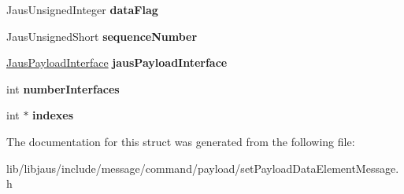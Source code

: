\begin{DoxyCompactItemize}
\item 
\hypertarget{struct_set_payload_data_element_message_struct_a895f189959ef442e142d099afbcdb52c}{\-Jaus\-Unsigned\-Integer {\bfseries data\-Flag}}\label{struct_set_payload_data_element_message_struct_a895f189959ef442e142d099afbcdb52c}

\item 
\hypertarget{struct_set_payload_data_element_message_struct_a06cad4ebc881972d26648121680a96a1}{\-Jaus\-Unsigned\-Short {\bfseries sequence\-Number}}\label{struct_set_payload_data_element_message_struct_a06cad4ebc881972d26648121680a96a1}

\item 
\hypertarget{struct_set_payload_data_element_message_struct_a40bcf4ae32ee747b23422000ee89b707}{\hyperlink{struct_jaus_payload_interface_struct}{\-Jaus\-Payload\-Interface} {\bfseries jaus\-Payload\-Interface}}\label{struct_set_payload_data_element_message_struct_a40bcf4ae32ee747b23422000ee89b707}

\item 
\hypertarget{struct_set_payload_data_element_message_struct_a8df8657dc927b0c69c0c5cbab6c9ed07}{int {\bfseries number\-Interfaces}}\label{struct_set_payload_data_element_message_struct_a8df8657dc927b0c69c0c5cbab6c9ed07}

\item 
\hypertarget{struct_set_payload_data_element_message_struct_a731c28c2b1cfe692ce4526e27eac52ab}{int $\ast$ {\bfseries indexes}}\label{struct_set_payload_data_element_message_struct_a731c28c2b1cfe692ce4526e27eac52ab}

\end{DoxyCompactItemize}


\-The documentation for this struct was generated from the following file\-:\begin{DoxyCompactItemize}
\item 
lib/libjaus/include/message/command/payload/set\-Payload\-Data\-Element\-Message.\-h\end{DoxyCompactItemize}
